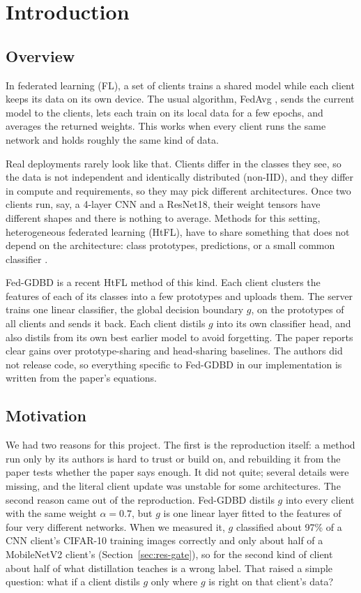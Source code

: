 \chapter{Introduction}
\label{ch:intro}

\section{Overview}

In federated learning (FL), a set of clients trains a shared model while each client keeps its data on its own device. The usual algorithm, FedAvg \cite{mcmahan2017fedavg}, sends the current model to the clients, lets each train on its local data for a few epochs, and averages the returned weights. This works when every client runs the same network and holds roughly the same kind of data.

Real deployments rarely look like that. Clients differ in the classes they see, so the data is not independent and identically distributed (non-IID), and they differ in compute and requirements, so they may pick different architectures. Once two clients run, say, a 4-layer CNN and a ResNet18, their weight tensors have different shapes and there is nothing to average. Methods for this setting, heterogeneous federated learning (HtFL), have to share something that does not depend on the architecture: class prototypes, predictions, or a small common classifier \cite{zhang2025htfllib}.

Fed-GDBD \cite{zhang2025gdbd} is a recent HtFL method of this kind. Each client clusters the features of each of its classes into a few prototypes and uploads them. The server trains one linear classifier, the global decision boundary $g$, on the prototypes of all clients and sends it back. Each client distils $g$ into its own classifier head, and also distils from its own best earlier model to avoid forgetting. The paper reports clear gains over prototype-sharing and head-sharing baselines. The authors did not release code, so everything specific to Fed-GDBD in our implementation is written from the paper's equations.

\section{Motivation}

We had two reasons for this project. The first is the reproduction itself: a method run only by its authors is hard to trust or build on, and rebuilding it from the paper tests whether the paper says enough. It did not quite; several details were missing, and the literal client update was unstable for some architectures. The second reason came out of the reproduction. Fed-GDBD distils $g$ into every client with the same weight $\alpha = 0.7$, but $g$ is one linear layer fitted to the features of four very different networks. When we measured it, $g$ classified about 97\% of a CNN client's CIFAR-10 training images correctly and only about half of a MobileNetV2 client's (Section~\ref{sec:res-gate}), so for the second kind of client about half of what distillation teaches is a wrong label. That raised a simple question: what if a client distils $g$ only where $g$ is right on that client's data?


